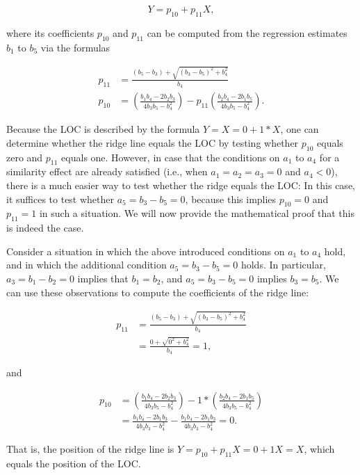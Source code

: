 \documentclass[jou,a4paper,draftfirst]{apa6}
\begin{document}
\begin{equation}
Y = p_{10} + p_{11}X,
\end{equation}

where its coefficients $p_{10}$ and $p_{11}$ can be computed from the regression estimates $b_1$ to $b_5$ via the formulas

\begin{align}
p_{11} &= 
\frac{(b_5 - b_3) + \sqrt{(b_3-b_5)^2 + b_{4}^{2}}}{b_4} \nonumber \\[0.3cm]
p_{10} &= \left(\frac{b_1b_4 - 2b_2b_3}{4b_3b_5 - b_{4}^{2}}\right) - p_{11} \left( \frac{b_2b_4 - 2b_1b_5}{4b_3b_5 - b_{4}^{2}} \right) \nonumber.
\end{align}

Because the LOC is described by the formula $Y = X = 0 + 1*X$, one can determine whether the ridge line equals the LOC by testing whether $p_{10}$ equals zero and $p_{11}$ equals one. However, in case that the conditions on $a_1$ to $a_4$ for a similarity effect are already satisfied (i.e., when $a_1 = a_2 = a_3 = 0$ and $a_4 < 0$), there is a much easier way to test whether the ridge equals the LOC: In this case, it suffices to test whether $a_5 = b_3 - b_5 = 0$, because this implies $p_{10} = 0$ and $p_{11} = 1$ in such a situation. We will now provide the mathematical proof that this is indeed the case. 

Consider a situation in which the above introduced conditions on $a_1$ to $a_4$ hold, and in which the additional condition $a_5 = b_3 - b_5 = 0$ holds. In particular, $a_3 = b_1 - b_2 = 0$ implies that $b_1 = b_2$, and $a_5 = b_3 - b_5 = 0$ implies $b_3 = b_5$. We can use these observations to compute the coefficients of the ridge line: 

\begin{align}
p_{11} &= \frac{(b_5 - b_3) + \sqrt{(b_3-b_5)^2 + b_{4}^{2}}}{b_4} \nonumber \\[0.3cm]
       &= \frac{0 + \sqrt{0^2 + b_{4}^{2}}}{b_4}  = 1 \nonumber,
\end{align}

and 

\begin{align}
p_{10} &= \left(\frac{b_1b_4 - 2b_2b_3}{4b_3b_5 - b_{4}^{2}}\right) - 1* \left( \frac{b_2b_4 - 2b_1b_5}{4b_3b_5 - b_{4}^{2}} \right) \nonumber \\[0.3cm]
       &= \frac{b_1b_4 - 2b_1b_3}{4b_3b_3 - b_{4}^{2}} - \frac{b_1b_4 - 2b_1b_3}{4b_3b_3 - b_{4}^{2}}  = 0 \nonumber.
\end{align}


That is, the position of the ridge line is $Y = p_{10} + p_{11}X = 0 + 1X = X$, which equals the position of the LOC. 
\end{document}
